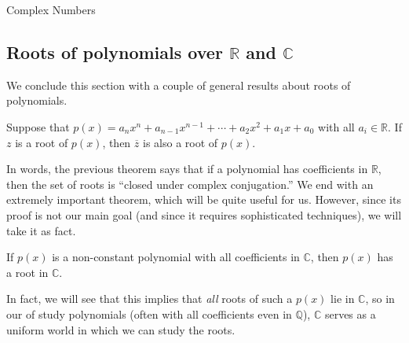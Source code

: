 \begin{section}{Complex Numbers}
\subsection{Roots of polynomials over  $\mathbb{R}$ and  $\mathbb{C}$}
We conclude this section with a couple of general results about roots of polynomials.

\begin{theorem}\label{thm.RootsRealCoeff}
Suppose that $p(x) = a_nx^n + a_{n-1}x^{n-1} +\cdots+a_2x^2+a_1x+a_0$ with all $a_i\in \mathbb{R}$. If $z$ is a root of $p(x)$, then $\overline{z}$ is also a root of $p(x)$.
\end{theorem}

In words, the previous theorem says that if a polynomial has coefficients in $\mathbb{R}$, then the set of roots is ``closed under complex conjugation.'' We end with an extremely important theorem, which will be quite useful for us. However, since its proof is not our main goal (and since it requires sophisticated techniques), we will take it as fact.

\begin{fact}\label{fact.FTA}
If $p(x)$ is a non-constant polynomial with all coefficients in $\mathbb{C}$, then $p(x)$ has a root in $\mathbb{C}$.
\end{fact}

In fact, we will see that this implies that \emph{all} roots of such a $p(x)$ lie in $\mathbb{C}$, so in our of study polynomials (often with all coefficients even in $\mathbb{Q}$), $\mathbb{C}$ serves as a uniform world in which we can study the roots.
\end{section}


